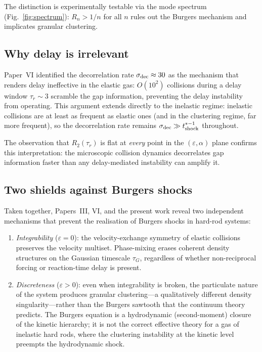 \documentclass[aps,pre,twocolumn,superscriptaddress,longbibliography,floatfix]{revtex4-2}
\begin{document}
The distinction is experimentally testable via the mode spectrum
(Fig.~\ref{fig:spectrum}): $R_n > 1/n$ for all $n$ rules out the
Burgers mechanism and implicates granular clustering.

\subsection{Why delay is irrelevant}

Paper~VI identified the decorrelation rate $\sigma_{\rm dec}
\approx 30$ as the mechanism that renders delay ineffective in
the elastic gas: $O(10^2)$ collisions during a delay window
$\tau_r \sim 3$ scramble the gap information, preventing the
delay instability from operating. This argument extends directly
to the inelastic regime: inelastic collisions are at least as
frequent as elastic ones (and in the clustering regime, far more
frequent), so the decorrelation rate remains $\sigma_{\rm dec}
\gg t^{*-1}_{\rm shock}$ throughout.

The observation that $R_2(\tau_r)$ is flat at \emph{every} point
in the $(\varepsilon, \alpha)$ plane confirms this
interpretation: the microscopic collision dynamics decorrelates
gap information faster than any delay-mediated instability can
amplify it.

\subsection{Two shields against Burgers shocks}

Taken together, Papers~III, VI, and the present work reveal two
independent mechanisms that prevent the realisation of Burgers
shocks in hard-rod systems:

\begin{enumerate}
\item \emph{Integrability} ($\varepsilon = 0$): the
velocity-exchange symmetry of elastic collisions preserves the
velocity multiset. Phase-mixing erases coherent density
structures on the Gaussian timescale $\tau_G$, regardless of
whether non-reciprocal forcing or reaction-time delay is
present.

\item \emph{Discreteness} ($\varepsilon > 0$): even when
integrability is broken, the particulate nature of the system
produces granular clustering---a qualitatively different density
singularity---rather than the Burgers sawtooth that the
continuum theory predicts. The Burgers equation is a
hydrodynamic (second-moment) closure of the kinetic hierarchy; it
is not the correct effective theory for a gas of inelastic hard
rods, where the clustering instability at the kinetic level
preempts the hydrodynamic shock.
\end{enumerate}
\end{document}
